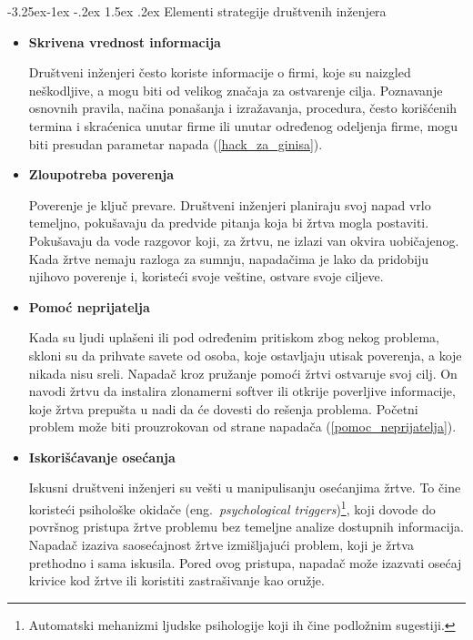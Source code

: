 \documentclass[a4paper]{article}
\makeatletter
\renewcommand\paragraph{\@startsection{paragraph}{4}{\z@}%
   {-3.25ex\@plus -1ex \@minus -.2ex}%
   {1.5ex \@plus .2ex}%
   {\normalfont\normalsize\bfseries}}
\makeatother
\begin{document}
\paragraph{Elementi strategije društvenih inženjera}
\begin{itemize}
\item \textbf{Skrivena vrednost informacija}

Društveni inženjeri često koriste informacije o firmi, koje su naizgled neškodljive, a mogu biti od velikog značaja za ostvarenje cilja. Poznavanje osnovnih pravila, načina ponašanja i izražavanja, procedura, često korišćenih termina i skraćenica unutar firme ili unutar određenog odeljenja firme, mogu biti presudan parametar napada (\ref{hack_za_ginisa}).

\item \textbf{Zloupotreba poverenja}

Poverenje je ključ prevare. Društveni inženjeri planiraju svoj napad vrlo temeljno, pokušavaju da predvide pitanja koja bi žrtva mogla postaviti. Pokušavaju da vode razgovor koji, za žrtvu, ne izlazi van okvira uobičajenog. Kada žrtve nemaju razloga za sumnju, napadačima je lako da pridobiju njihovo poverenje i, koristeći svoje veštine, ostvare svoje ciljeve.

\item \textbf{Pomoć neprijatelja}

Kada su ljudi uplašeni ili pod određenim pritiskom zbog nekog problema, skloni su da prihvate savete od osoba, koje ostavljaju utisak poverenja, a koje nikada nisu sreli. Napadač kroz pružanje pomoći žrtvi ostvaruje svoj cilj. On navodi žrtvu da instalira zlonamerni softver ili otkrije poverljive informacije, koje žrtva prepušta u nadi da će dovesti do rešenja problema. Početni problem može biti prouzrokovan od strane napadača (\ref{pomoc_neprijatelja}).

\item \textbf{Iskorišćavanje osećanja}

Iskusni društveni inženjeri su vešti u manipulisanju osećanjima žrtve. To čine koristeći psihološke okidače (eng.~{\em psychological triggers})\footnote{Automatski mehanizmi ljudske psihologije koji ih čine podložnim sugestiji.}, koji dovode do površnog pristupa žrtve problemu bez temeljne analize dostupnih informacija. Napadač izaziva saosećajnost žrtve izmišljajući problem, koji je žrtva prethodno i sama iskusila. Pored ovog pristupa, napadač može izazvati osećaj krivice kod žrtve ili koristiti zastrašivanje kao oružje.


\end{itemize}
\end{document}
